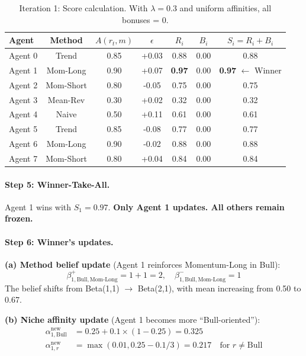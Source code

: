 \begin{table}[h]
\centering
\small
\caption{Iteration 1: Score calculation. With $\lambda = 0.3$ and uniform affinities, all bonuses = 0.}
\begin{tabular}{l|c|c|c|c|c|c}
\toprule
\textbf{Agent} & \textbf{Method} & $A(r_t, m)$ & $\epsilon$ & $R_i$ & $B_i$ & $S_i = R_i + B_i$ \\
\midrule
Agent 0 & Trend & 0.85 & +0.03 & 0.88 & 0.00 & 0.88 \\
\rowcolor{green!15} Agent 1 & Mom-Long & 0.90 & +0.07 & \textbf{0.97} & 0.00 & \textbf{0.97} $\leftarrow$ Winner \\
Agent 2 & Mom-Short & 0.80 & -0.05 & 0.75 & 0.00 & 0.75 \\
Agent 3 & Mean-Rev & 0.30 & +0.02 & 0.32 & 0.00 & 0.32 \\
Agent 4 & Naive & 0.50 & +0.11 & 0.61 & 0.00 & 0.61 \\
Agent 5 & Trend & 0.85 & -0.08 & 0.77 & 0.00 & 0.77 \\
Agent 6 & Mom-Long & 0.90 & -0.02 & 0.88 & 0.00 & 0.88 \\
Agent 7 & Mom-Short & 0.80 & +0.04 & 0.84 & 0.00 & 0.84 \\
\bottomrule
\end{tabular}
\end{table}

\paragraph{Step 5: Winner-Take-All.}

Agent 1 wins with $S_1 = 0.97$. \textbf{Only Agent 1 updates. All others remain frozen.}

\paragraph{Step 6: Winner's updates.}

\textbf{(a) Method belief update} (Agent 1 reinforces Momentum-Long in Bull):
\begin{equation}
\beta^+_{1,\text{Bull},\text{Mom-Long}} = 1 + 1 = 2, \quad \beta^-_{1,\text{Bull},\text{Mom-Long}} = 1
\end{equation}
The belief shifts from Beta(1,1) $\to$ Beta(2,1), with mean increasing from 0.50 to 0.67.

\textbf{(b) Niche affinity update} (Agent 1 becomes more ``Bull-oriented''):
\begin{align}
\alpha_{1,\text{Bull}}^{\text{new}} &= 0.25 + 0.1 \times (1 - 0.25) = 0.325 \\
\alpha_{1,r}^{\text{new}} &= \max(0.01, 0.25 - 0.1/3) = 0.217 \quad \text{for } r \neq \text{Bull}
\end{align}

